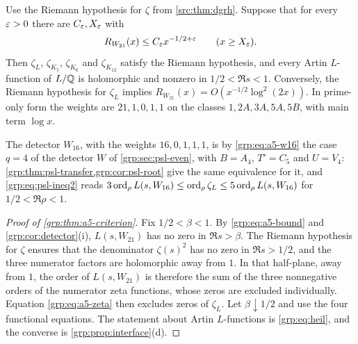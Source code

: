 \begin{theorem}\label{grp:thm:a5-criterion}
Use the Riemann hypothesis for $\zeta$ from \cref{src:thm:dgrh}. Suppose that for
every $\varepsilon>0$ there are $C_\varepsilon,X_\varepsilon$ with
\begin{equation}\label{grp:eq:a5-bound}
 R_{W_{21}}(x)\le C_\varepsilon x^{-1/2+\varepsilon}\qquad(x\ge X_\varepsilon).
\end{equation}
Then $\zeta_L$, $\zeta_{K_5}$, $\zeta_{K_6}$ and $\zeta_{K_{12}}$ satisfy the
Riemann hypothesis, and every Artin $L$-function of $L/\mathbb{Q}$ is holomorphic and
nonzero in $1/2<\Re s<1$. Conversely, the Riemann hypothesis for $\zeta_L$
implies $R_{W_{21}}(x)=O(x^{-1/2}\log^2(2x))$. In prime-only form the weights are
$21,1,0,1,1$ on the classes $1,2A,3A,5A,5B$, with main term $\log x$.
\end{theorem}

The detector $W_{16}$, with the weights $16,0,1,1,1$, is by \eqref{grp:eq:a5-w16} the
case $q=4$ of the detector $W$ of \cref{grp:sec:psl-even}, with $B=A_4$, $T'=C_5$ and
$U=V_4$: \cref{grp:thm:psl-transfer,grp:cor:psl-root} give the same equivalence for it,
and \eqref{grp:eq:psl-ineq2} reads
$3\operatorname{ord}_\rho L(s,W_{16})\le\operatorname{ord}_\rho\zeta_L\le5\operatorname{ord}_\rho L(s,W_{16})$ for
$1/2<\Re\rho<1$.

\begin{proof}[Proof of \cref{grp:thm:a5-criterion}]
Fix $1/2<\beta<1$. By \eqref{grp:eq:a5-bound} and
\cref{grp:cor:detector}(i), $L(s,W_{21})$ has no zero in $\Re s>\beta$. The
Riemann hypothesis for $\zeta$ ensures that the denominator $\zeta(s)^2$ has
no zero in $\Re s>1/2$, and the three numerator factors are holomorphic away
from $1$. In that half-plane, away from $1$, the order of $L(s,W_{21})$ is
therefore the sum of the three nonnegative orders of the numerator zeta
functions, whose zeros are excluded individually. Equation
\eqref{grp:eq:a5-zeta} then excludes zeros of $\zeta_L$. Let
$\beta\downarrow1/2$ and use the four functional equations. The statement
about Artin $L$-functions is \eqref{grp:eq:heil}, and the converse is
\cref{grp:prop:interface}(d).
\end{proof}

